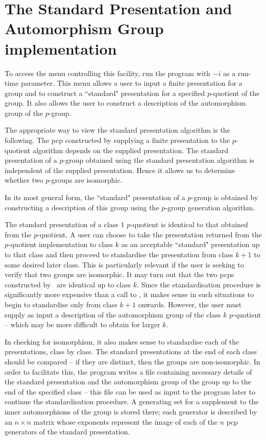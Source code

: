 \section{The Standard Presentation and Automorphism Group implementation}
To access the menu controlling this facility, run the program 
with $-i$ as a run-time parameter. This menu allows a user 
to input a finite presentation for a group and to construct 
a ``standard" presentation for a specified $p$-quotient of the group. 
It also allows the user to construct a description of the automorphism
group of the $p$-group.

The appropriate way to view the standard presentation algorithm is the
following.
The pcp constructed by supplying a finite presentation to
the $p$-quotient algorithm depends on the supplied presentation.
The standard presentation of a $p$-group obtained using
the standard presentation algorithm is independent of the
supplied presentation. Hence it allows us to determine whether 
two $p$-groups are isomorphic.

In its most general form, the ``standard" presentation 
of a $p$-group is obtained by constructing a description of this
group using the $p$-group generation algorithm. 

The standard presentation of a class 1 $p$-quotient
is identical to that obtained from the $p$-quotient.
A user can choose to take the presentation returned
from the $p$-quotient implementation to class $k$ 
as an acceptable ``standard" presentation up to that 
class and then proceed to standardise the presentation 
from class $k + 1$ to some desired later class.
This is particularly relevant if the user is seeking
to verify that two groups are isomorphic.
It may turn out that the two pcps 
constructed by \pq\ are identical up to class $k$.
Since the standardisation procedure is significantly more
expensive than a call to \pq, it makes sense in such 
situations to begin to standardise only from class $k + 1$ onwards.
However, the user must supply as input a description
of the automorphism group of the class $k$ $p$-quotient
-- which may be more difficult to obtain for larger $k$.

In checking for isomorphism, it also makes sense
to standardise each of the presentations,
class by class. The standard presentations
at the end of each class should be compared --
if they are distinct, then the groups are non-isomorphic.
In order to facilitate this, the program writes a 
file containing necessary details of the standard presentation and the 
automorphism group of the group up to the end of the specified class 
-- this file can be used as input to the program later to
continue the standardisation procedure. 
A generating set for a supplement to the inner automorphisms of the
group is stored there; each generator is described by  an $n \times n$
 matrix whose exponents represent the image of each of the $n$
pcp generators of the standard presentation.

